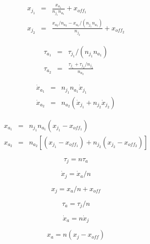 \documentclass{article}
\begin{document}
\begin{eqnarray*}
x_{j_1} & = & \frac{ x_{a_1} }{ n_{j_1} n_{a_1} } + x_{off_1} \\
x_{j_2} & = & \frac{ x_{a_2} / n_{a_2} - x_{a_1} / (n_{j_1} n_{a_1}) }{ n_{j_2} } + x_{off_2}
\end{eqnarray*}
\pagebreak

\begin{eqnarray*}
\tau_{a_1} & = & \tau_{j_1} / (n_{j_1} n_{a_1}) \\
\tau_{a_2} & = & \frac{ \tau_{j_1} + \tau_{j_2} / n_{j_2} }{ n_{a_2} }
\end{eqnarray*}
\pagebreak

\begin{eqnarray*}
\dot{x}_{a_1} & = & n_{j_1} n_{a_1} \dot{x}_{j_1} \\
\dot{x}_{a_2} & = & n_{a_2} (\dot{x}_{j_1} + n_{j_2} \dot{x}_{j_2})
\end{eqnarray*}
\pagebreak

\begin{eqnarray*}
x_{a_1} & = & n_{j_1} n_{a_1} (x_{j_1} - x_{off_1}) \\
x_{a_2} & = & n_{a_2} \left[(x_{j_1} - x_{off_1}) + n_{j_2} (x_{j_2}  - x_{off_2})\right]
\end{eqnarray*}
\pagebreak

\[ \tau_j = n \tau_a \]
\pagebreak

\[ \dot{x}_j = \dot{x}_a / n \]
\pagebreak

\[ x_j = x_a / n + x_{off} \]
\pagebreak

\[ \tau_a = \tau_j / n\]
\pagebreak

\[ \dot{x}_a = n \dot{x}_j \]
\pagebreak

\[ x_a = n (x_j - x_{off}) \]
\pagebreak
\end{document}

